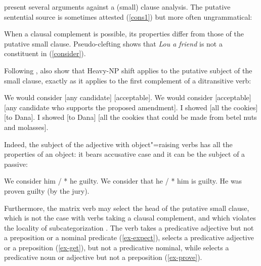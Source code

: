 \citet[Chapter~3]{PollardandSag1994} present several arguments against a (small) clause
analysis. The putative sentential source is sometimes attested (\ref{cons1}) but more often
ungrammatical:
	
\eal
{}
\zl

	
When a clausal complement is possible, its properties differ from those of the putative small clause. Pseudo-clefting shows that \textit{Lou a friend} is not a constituent in (\ref{consider}).

\ealnoraggedright
{}
\zl

Following \citet{Bresnan1982}\addpages, \citet[113]{PollardandSag1994} also show that Heavy-NP shift
applies to the putative subject of the small clause, exactly as it applies to the first complement
of a ditransitive verb:

\eal
\ex We would consider [any candidate] [acceptable].
\ex We would consider [acceptable]  [any candidate who supports the proposed amendment].
\ex I showed [all the cookies] [to Dana].
\ex I showed [to Dana]  [all the cookies that could be made from betel nuts and molasses].  
\zl

Indeed, the subject of the adjective with object"=raising verbs has all the properties of an
object: it bears accusative case and it can be the subject of a passive:

\eal
\ex We consider him / * he guilty.
\ex We consider that he / * him is guilty.
\ex He was proven guilty (by the jury).	
\zl
	

Furthermore, the matrix verb may select the head of the putative small clause, which is not the case
with verbs taking a clausal complement, and which violates the 
locality of subcategorization \parencites[]{PollardandSag1994}{Sag2007a}. The
verb  takes a predicative adjective but not a preposition or a nominal predicate (\ref{ex-expect}),
 selects a predicative adjective or a preposition (\ref{ex-get}), but not a predicative nominal, while
 selects a predicative noun or adjective but not a preposition (\ref{ex-prove}).


